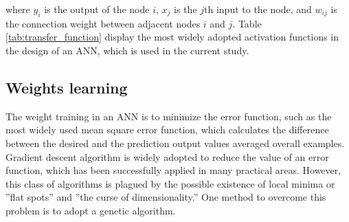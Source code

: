 where $y_i$ is the output of the node $i$, $x_j$ is the $j$th input to the
node, and $w_{ij}$ is the connection weight between adjacent nodes $i$ and $j$.
Table \ref{tab:transfer_function} display the most widely adopted activation
functions in the design of an ANN, which is used in the current study.



\subsection{Weights learning}
The weight training in an ANN is to minimize the error function, such as the
most widely used mean square error function, which calculates the difference
between the desired and the prediction output values averaged overall examples.
Gradient descent algorithm is widely adopted to reduce the value of an error
function, which has been successfully applied in many practical areas. However,
this class of algorithms is plagued by the possible existence of local minima
or ”flat spots” and ”the curse of dimensionality.” One method to overcome this
problem is to adopt a genetic algorithm.

